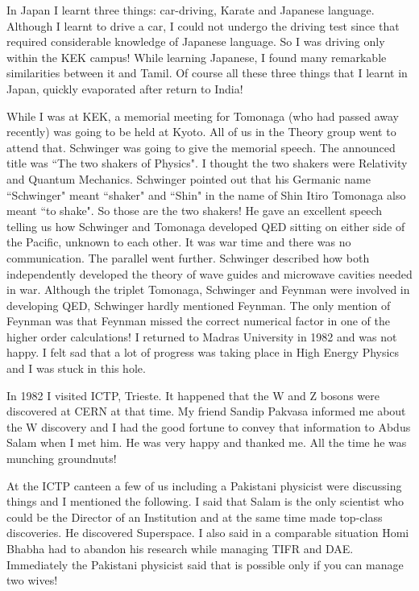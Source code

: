 In Japan I learnt three things: car-driving, Karate and Japa\-nese 
language. Although I learnt to drive a car, I could not under\-go the 
driving test since that required considerable knowledge of Japanese 
language. So I was driving only within the KEK campus! While learning 
Japanese, I found many remarkable similari\-ties between it and Tamil. Of 
course all these three things that I learnt in Japan, quickly evaporated 
after return to India!


While I was at KEK, a memorial meeting for Tomonaga (who had passed away 
recently) was going to be held at Kyoto. All of us in the Theory group 
went to attend that. Schwinger was going to give the memorial speech. 
The announced title was ``The two shakers of Physics". I thought the two 
shakers were Relati\-vity and Quantum Mechanics. Schwinger pointed out 
that his Germani\-c name ``Schwinger" meant ``shaker" and ``Shin" in the name 
of Shin Itiro Tomonaga also meant ``to shake". So those are the two 
shakers! He gave an excellent speech telling us how Schwinger and 
Tomonaga developed QED sitting on either side of the Pacific, unknown to 
each other. It was war time and there was no communication. The parallel 
went further. Schwinger described how both independently developed the 
theory of wave guides and microwave cavities needed in war. Although the 
trip\-let Tomonaga, Schwinger and Feynman were involved in deve\-loping QED, 
Schwinger hardly mentioned Feynman. The only mention of Feynman was that 
Feynman missed the correct numerical factor in one of the higher order 
calculations!
\vskip 1pt
I returned to Madras University in 1982 and was not happy. I felt sad 
that a lot of progress was taking place in High Energy Physics and I was 
stuck in this hole.

In 1982 I visited ICTP, Trieste. It happened that the W and Z bosons 
were discovered at CERN at that time. My friend Sandip Pakvasa informed 
me about the W discovery and I had the good fortune to convey that 
information to Abdus Salam when I met him. He was very happy and thanked 
me. All the time he was munching groundnuts!

At the ICTP canteen a few of us including a Pakistani physicist were 
discussing things and I mentioned the following. I said that Salam is 
the only scientist who could be the Director of an Institution and at 
the same time made top-class discoveries. He discovered Superspace. I 
also said in a comparable situation Ho\-mi Bhabha had to abandon his 
research while managing TIFR and DAE. Immediately the Pakistani 
physicist said that is possible only if you can manage two wives!


